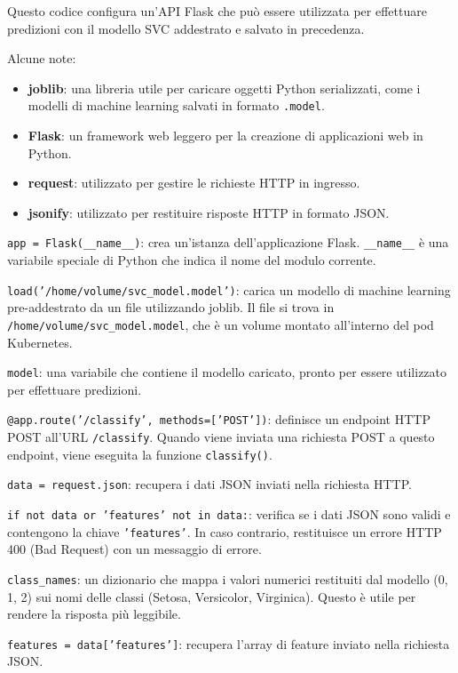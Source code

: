 \documentclass[11pt, a4paper]{article}
\begin{document}
Questo codice configura un'API Flask che può essere utilizzata per effettuare predizioni con il modello SVC addestrato e salvato in precedenza.

Alcune note:
\begin{itemize}[noitemsep]
    \item \textbf{joblib}: una libreria utile per caricare oggetti Python serializzati, come i modelli di machine learning salvati in formato \texttt{.model}.
    \item \textbf{Flask}: un framework web leggero per la creazione di applicazioni web in Python.
    \item \textbf{request}: utilizzato per gestire le richieste HTTP in ingresso.
    \item \textbf{jsonify}: utilizzato per restituire risposte HTTP in formato JSON.
\end{itemize}

\texttt{app = Flask(\_\_name\_\_)}: crea un'istanza dell'applicazione Flask. \texttt{\_\_name\_\_} è una variabile speciale di Python che indica il nome del modulo corrente.

\texttt{load('/home/volume/svc\_model.model')}: carica un modello di machine learning pre-addestrato da un file utilizzando joblib. Il file si trova in \texttt{/home/volume/svc\_model.model}, che è un volume montato all'interno del pod Kubernetes.

\texttt{model}: una variabile che contiene il modello caricato, pronto per essere utilizzato per effettuare predizioni.


\texttt{@app.route('/classify', methods=['POST'])}: definisce un endpoint HTTP POST all'URL \texttt{/classify}. Quando viene inviata una richiesta POST a questo endpoint, viene eseguita la funzione \texttt{classify()}.

\texttt{data = request.json}: recupera i dati JSON inviati nella richiesta HTTP.

\texttt{if not data or 'features' not in data:}: verifica se i dati JSON sono validi e contengono la chiave \texttt{'features'}. In caso contrario, restituisce un errore HTTP 400 (Bad Request) con un messaggio di errore.

\texttt{class\_names}: un dizionario che mappa i valori numerici restituiti dal modello (0, 1, 2) sui nomi delle classi (Setosa, Versicolor, Virginica). Questo è utile per rendere la risposta più leggibile.

\texttt{features = data['features']}: recupera l'array di feature inviato nella richiesta JSON.
\end{document}
